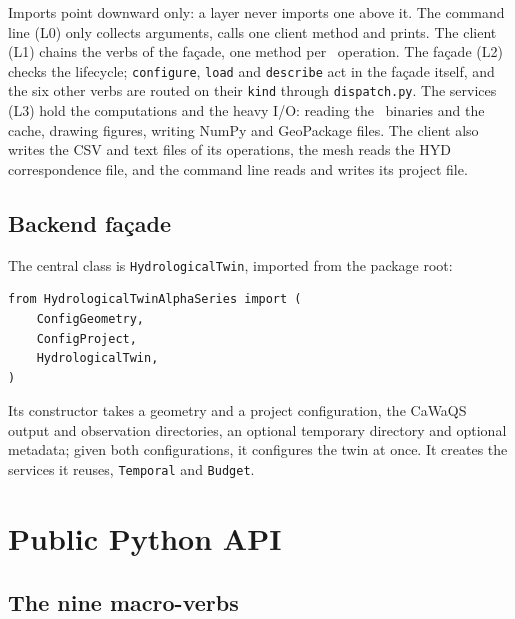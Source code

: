 Imports point downward only: a layer never imports one above it. The command
line (L0) only collects arguments, calls one client method and prints. The
client (L1) chains the verbs of the façade, one method per \cwv\ operation.
The façade (L2) checks the lifecycle; \texttt{configure}, \texttt{load}
and \texttt{describe} act in the façade itself, and the six other verbs are
routed on their \texttt{kind} through \texttt{dispatch.py}. The services (L3)
hold the computations and the heavy I/O: reading the \cw\ binaries and the
cache, drawing figures, writing NumPy and GeoPackage files. The client also
writes the CSV and text files of its operations, the mesh reads the HYD
correspondence file, and the command line reads and writes its project
file.

\subsection{Backend façade}

The central class is \texttt{HydrologicalTwin}, imported from the package
root:

\begin{verbatim}
from HydrologicalTwinAlphaSeries import (
    ConfigGeometry,
    ConfigProject,
    HydrologicalTwin,
)
\end{verbatim}

Its constructor takes a geometry and a project configuration, the CaWaQS
output and observation directories, an optional temporary directory and
optional metadata; given both configurations, it configures the twin at once.
It creates the services it reuses, \texttt{Temporal} and \texttt{Budget}.


\section{Public Python API}

\subsection{The nine macro-verbs}

